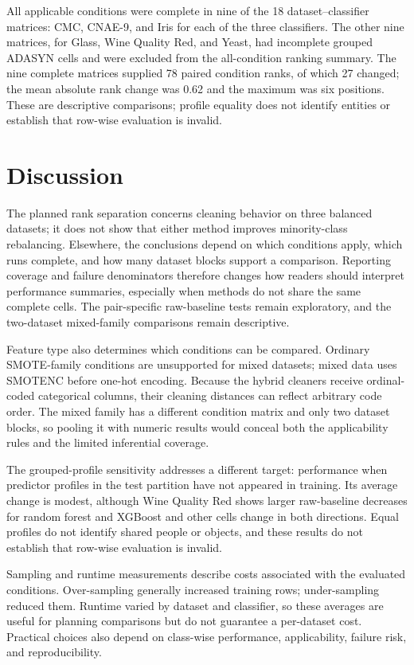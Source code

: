 \documentclass[10pt]{article}
\begin{document}
All applicable conditions were complete in nine of the 18 dataset--classifier matrices: CMC, CNAE-9, and Iris for each of the three classifiers. The other nine matrices, for Glass, Wine Quality Red, and Yeast, had incomplete grouped ADASYN cells and were excluded from the all-condition ranking summary. The nine complete matrices supplied 78 paired condition ranks, of which 27 changed; the mean absolute rank change was 0.62 and the maximum was six positions. These are descriptive comparisons; profile equality does not identify entities or establish that row-wise evaluation is invalid.

\section{Discussion}
\label{sec:discussion}

The planned rank separation concerns cleaning behavior on three balanced datasets; it does not show that either method improves minority-class rebalancing. Elsewhere, the conclusions depend on which conditions apply, which runs complete, and how many dataset blocks support a comparison. Reporting coverage and failure denominators therefore changes how readers should interpret performance summaries, especially when methods do not share the same complete cells. The pair-specific raw-baseline tests remain exploratory, and the two-dataset mixed-family comparisons remain descriptive.

Feature type also determines which conditions can be compared. Ordinary SMOTE-family conditions are unsupported for mixed datasets; mixed data uses SMOTENC before one-hot encoding. Because the hybrid cleaners receive ordinal-coded categorical columns, their cleaning distances can reflect arbitrary code order. The mixed family has a different condition matrix and only two dataset blocks, so pooling it with numeric results would conceal both the applicability rules and the limited inferential coverage.

The grouped-profile sensitivity addresses a different target: performance when predictor profiles in the test partition have not appeared in training. Its average change is modest, although Wine Quality Red shows larger raw-baseline decreases for random forest and XGBoost and other cells change in both directions. Equal profiles do not identify shared people or objects, and these results do not establish that row-wise evaluation is invalid.

Sampling and runtime measurements describe costs associated with the evaluated conditions. Over-sampling generally increased training rows; under-sampling reduced them. Runtime varied by dataset and classifier, so these averages are useful for planning comparisons but do not guarantee a per-dataset cost. Practical choices also depend on class-wise performance, applicability, failure risk, and reproducibility.
\end{document}

